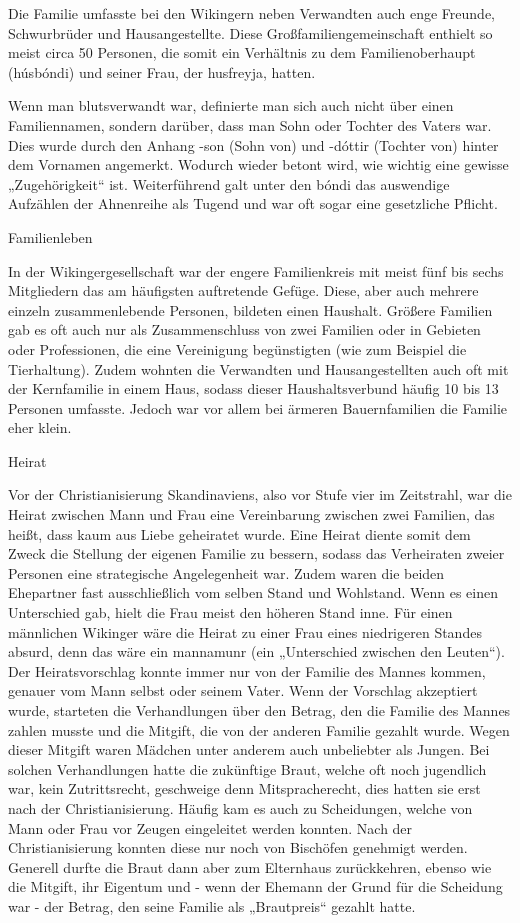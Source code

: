 \documentclass[12pt,a4paper,ngerman,openany]{book}
\begin{document}
Die Familie umfasste bei den Wikingern neben Verwandten auch enge Freunde,
Schwurbrüder und Hausangestellte. Diese Großfamiliengemeinschaft enthielt so meist circa 50 Personen, die somit ein Verhältnis zu dem Familienoberhaupt (húsbóndi) und seiner Frau, der husfreyja, hatten.

Wenn man blutsverwandt war, definierte man sich auch nicht über einen Familiennamen, sondern darüber, dass man Sohn oder Tochter des Vaters war. Dies wurde durch den Anhang -son (Sohn von) und -dóttir (Tochter von) hinter dem Vornamen angemerkt.
Wodurch wieder betont wird, wie wichtig eine gewisse „Zugehörigkeit“ ist. Weiterführend galt unter den bóndi das auswendige Aufzählen der Ahnenreihe als Tugend und war oft sogar eine gesetzliche Pflicht.


Familienleben

In der Wikingergesellschaft war der engere Familienkreis mit meist fünf bis sechs Mitgliedern das am häufigsten auftretende Gefüge. Diese, aber auch mehrere einzeln zusammenlebende Personen, bildeten einen Haushalt. Größere Familien gab es oft auch nur als Zusammenschluss von zwei Familien oder in Gebieten oder Professionen, die eine Vereinigung begünstigten (wie zum Beispiel die Tierhaltung). Zudem wohnten die Verwandten und Hausangestellten auch oft mit der Kernfamilie in einem Haus, sodass dieser Haushaltsverbund häufig 10 bis 13 Personen umfasste. Jedoch war vor allem bei ärmeren Bauernfamilien die Familie eher klein.

Heirat

Vor der Christianisierung Skandinaviens, also vor Stufe vier im Zeitstrahl, war die Heirat zwischen Mann und Frau eine Vereinbarung zwischen zwei Familien, das heißt, dass kaum aus Liebe geheiratet wurde. Eine Heirat diente somit dem Zweck die Stellung der eigenen
Familie zu bessern, sodass das Verheiraten zweier Personen eine strategische Angelegenheit war. Zudem waren die beiden Ehepartner fast ausschließlich vom
selben Stand und Wohlstand. Wenn es einen Unterschied gab, hielt die Frau meist den höheren Stand inne. Für einen männlichen Wikinger wäre die Heirat zu einer Frau eines niedrigeren Standes absurd, denn das wäre ein mannamunr (ein „Unterschied zwischen den Leuten“).
Der Heiratsvorschlag konnte immer nur von der Familie des Mannes kommen, genauer vom Mann selbst oder seinem Vater. Wenn der Vorschlag akzeptiert wurde, starteten die Verhandlungen über den Betrag, den die Familie des Mannes zahlen musste und die Mitgift,
die von der anderen Familie gezahlt wurde. Wegen dieser Mitgift waren Mädchen unter
anderem auch unbeliebter als Jungen.
Bei solchen Verhandlungen hatte die zukünftige Braut, welche oft noch jugendlich war, kein Zutrittsrecht, geschweige denn Mitspracherecht, dies hatten sie erst nach der Christianisierung.
Häufig kam es auch zu Scheidungen, welche von Mann oder Frau vor Zeugen eingeleitet werden konnten. Nach der Christianisierung konnten diese nur noch von Bischöfen genehmigt werden.
Generell durfte die Braut dann aber zum Elternhaus zurückkehren, ebenso wie die Mitgift,
ihr Eigentum und - wenn der Ehemann der Grund für die Scheidung war - der Betrag, den seine Familie als „Brautpreis“ gezahlt hatte.
\end{document}
